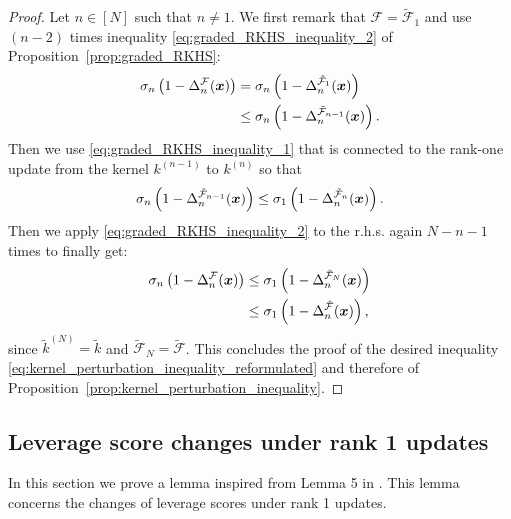 \documentclass[twoside,11pt]{book}
\DeclareMathOperator{\Tran}{\intercal}
\begin{document}
\begin{proof}
%
Let $n \in [N]$ such that $n \neq 1$.
We first remark that $\mathcal{F}=\tilde{\mathcal{F}}_{1} $ and use $(n-2)$ times inequality \eqref{eq:graded_RKHS_inequality_2} of Proposition~\ref{prop:graded_RKHS}:
\begin{align}
  \sigma_{n} \left(1- \Delta_n^{\cal F}(\bm{x}) \right) & = \sigma_{n}  \left(1- \Delta_n^{\tilde{\cal F}_{1}}(\bm{x}) \right) \\
  & \leq  \sigma_{n} \left(1-\Delta_n^{\tilde{\cal F}_{n-1}}(\bm{x}) \right). \nonumber
\end{align}
Then we use \eqref{eq:graded_RKHS_inequality_1} that is connected to the rank-one update from the kernel $k^{(n-1)}$ to $k^{(n)}$ so that
\begin{equation}
  \sigma_{n} \left(1-\Delta_n^{\tilde{\cal F}_{n-1}}(\bm{x}) \right)
  \leq
  \sigma_{1} \left(1-\Delta_n^{\tilde{\cal F}_{n}}(\bm{x}) \right).
\end{equation}
Then we apply \eqref{eq:graded_RKHS_inequality_2} to the r.h.s. again $N-n-1$ times to finally get:
\begin{align}
\sigma_{n} \left(1-\Delta_n^{\cal F}(\bm{x}) \right)
& \leq \sigma_{1} \left(1-\Delta_n^{\tilde{\cal F}_{N}}(\bm{x}) \right) \\
& \leq \sigma_{1} \left(1-\Delta_n^{\tilde{\cal F}}(\bm{x}) \right) \nonumber,
\end{align}
since $\tilde{k}^{(N)}=\tilde{k}$ and $\tilde{\mathcal{F}}_{N} = \tilde{\mathcal{F}}$. This concludes the proof of the desired inequality \eqref{eq:kernel_perturbation_inequality_reformulated} and therefore of Proposition~\ref{prop:kernel_perturbation_inequality}.
\end{proof}


\subsection{Leverage score changes under rank 1 updates}\label{subsec:lv_score_updates}
In this section we prove a lemma inspired from Lemma 5 in \cite{Coh15}. This lemma concerns the changes of leverage scores under rank 1 updates.
\end{document}
